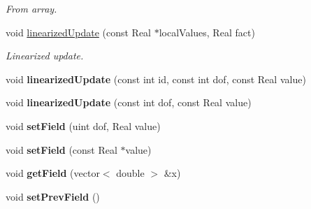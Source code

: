 \begin{DoxyCompactItemize}
\begin{DoxyCompactList}\small\item\em From array. \item\end{DoxyCompactList}\item 
\hypertarget{classvoom_1_1_mechanics_model_a96c78de2bbd08e9140466ddc3da232c3}{
void \hyperlink{classvoom_1_1_mechanics_model_a96c78de2bbd08e9140466ddc3da232c3}{linearizedUpdate} (const Real $\ast$localValues, Real fact)}
\label{classvoom_1_1_mechanics_model_a96c78de2bbd08e9140466ddc3da232c3}

\begin{DoxyCompactList}\small\item\em Linearized update. \item\end{DoxyCompactList}\item 
\hypertarget{classvoom_1_1_mechanics_model_a8671307c4a0ad1bd9ccde70be8eac493}{
void {\bfseries linearizedUpdate} (const int id, const int dof, const Real value)}
\label{classvoom_1_1_mechanics_model_a8671307c4a0ad1bd9ccde70be8eac493}

\item 
\hypertarget{classvoom_1_1_mechanics_model_a9890cd74e99b5533742818ae8ab31899}{
void {\bfseries linearizedUpdate} (const int dof, const Real value)}
\label{classvoom_1_1_mechanics_model_a9890cd74e99b5533742818ae8ab31899}

\item 
\hypertarget{classvoom_1_1_mechanics_model_a1edad0020c28c09513c128b44acbdeec}{
void {\bfseries setField} (uint dof, Real value)}
\label{classvoom_1_1_mechanics_model_a1edad0020c28c09513c128b44acbdeec}

\item 
\hypertarget{classvoom_1_1_mechanics_model_a7c5d125b0ebee6f0e6a5691d9f793be5}{
void {\bfseries setField} (const Real $\ast$value)}
\label{classvoom_1_1_mechanics_model_a7c5d125b0ebee6f0e6a5691d9f793be5}

\item 
\hypertarget{classvoom_1_1_mechanics_model_a09cbdeeb1848225d42fabf7a97a99857}{
void {\bfseries getField} (vector$<$ double $>$ \&x)}
\label{classvoom_1_1_mechanics_model_a09cbdeeb1848225d42fabf7a97a99857}

\item 
\hypertarget{classvoom_1_1_mechanics_model_aca075fea4b9ed6855cabe7eb2d91caf0}{
void {\bfseries setPrevField} ()}
\label{classvoom_1_1_mechanics_model_aca075fea4b9ed6855cabe7eb2d91caf0}


\end{DoxyCompactItemize}

